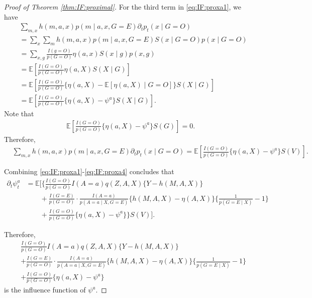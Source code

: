 \documentclass[10pt]{article}
\newcommand{\E}{\mathbb{E}}
\begin{document}
\begin{proof}[Proof of Theorem \ref{thm:IF:proximal}]
For the third term in \eqref{eq:IF:proxa1}, we have
\begin{align*}
&\sum_{m,x} h(m,a,x)p(m\mid a,x,G=E)\partial_t p_t(x\mid G=O)\\
&=\sum_{x}\sum_m h(m,a,x)p(m\mid a,x,G=E)S(x\mid G=O)p(x\mid G=O)\\
&=\sum_{x,g}\frac{I(g=O)}{p(G=O)}\eta(a,x)S(x\mid g)p(x,g)\\
&=\E[\frac{I(G=O)}{p(G=O)}\eta(a,X)S(X\mid G)]\\
&=\E[\frac{I(G=O)}{p(G=O)}\{\eta(a,X)-\E[\eta(a,X)\mid G=O]\}S(X\mid G)]\\
&=\E[\frac{I(G=O)}{p(G=O)}\{\eta(a,X)-\psi^a\}S(X\mid G)].
\end{align*}
Note that
\begin{align*}
\E[\frac{I(G=O)}{p(G=O)}\{\eta(a,X)-\psi^a\}S(G)]=0.
\end{align*}
Therefore,
\begin{equation}
\label{eq:IF:proxa4}
\begin{aligned}
&\sum_{m,x} h(m,a,x)p(m\mid a,x,G=E)\partial_t p_t(x\mid G=O)
=\E[\frac{I(G=O)}{p(G=O)}\{\eta(a,X)-\psi^a\}S(V)].
\end{aligned}
\end{equation}



Combining \eqref{eq:IF:proxa1}-\eqref{eq:IF:proxa4} concludes that
\begin{align*}
\partial_t\psi^a_t&=\E
\Big[\Big\{
\frac{I(G=O)}{p(G=O)}I(A=a)q(Z,A,X)\{Y-h(M,A,X)\}\\
&\qquad+\frac{I(G=E)}{p(G=O)}\cdot\frac{I(A=a)}{p(A=a\mid X,G=E)}
\{h(M,A,X)-\eta(A,X)\}\{\frac{1}{p(G=E\mid X)}-1\}\\
&\qquad+\frac{I(G=O)}{p(G=O)}\{\eta(a,X)-\psi^a\}
\Big\}S(V)\Big].
\end{align*}

Therefore, 
\begin{align*}
&\frac{I(G=O)}{p(G=O)}I(A=a)q(Z,A,X)\{Y-h(M,A,X)\}\\
&+\frac{I(G=E)}{p(G=O)}\cdot\frac{I(A=a)}{p(A=a\mid X,G=E)}
\{h(M,A,X)-\eta(A,X)\}\{\frac{1}{p(G=E\mid X)}-1\}\\
&+\frac{I(G=O)}{p(G=O)}\{\eta(a,X)-\psi^a\}
\end{align*}
is the influence function of $\psi^a$.

	
\end{proof}
\end{document}
